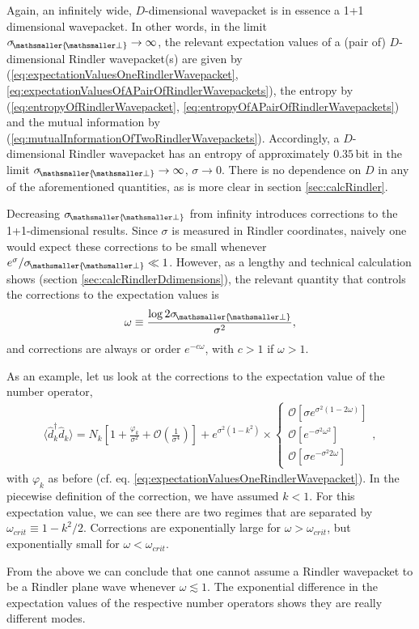 \documentclass[11pt, a4paper]{article}
\newcommand{\om}{\omega}
\newcommand{\si}{{\sigma}}
\let\perptmp\perp
\renewcommand{\perp}{{\! \mathsmaller{\perptmp}}}
\newcommand{\nodagger}{{\phantom{\dagger}}}
\newcommand{\ddd}{\langle \hat d_k^\dagger \hat d^\nodagger_k \rangle}
\begin{document}
Again, an infinitely wide, $D$-dimensional wavepacket is in essence a 1+1 dimensional wavepacket. In other words, in the limit $\si_\perp\to\infty$, the relevant expectation values of a (pair of) $D$-dimensional Rindler wavepacket(s) are given by (\ref{eq:expectationValuesOneRindlerWavepacket}, \ref{eq:expectationValuesOfAPairOfRindlerWavepackets}), the entropy by (\ref{eq:entropyOfRindlerWavepacket}, \ref{eq:entropyOfAPairOfRindlerWavepackets}) and the mutual information by (\ref{eq:mutualInformationOfTwoRindlerWavepackets}). Accordingly, a $D$-dimensional Rindler wavepacket has an entropy of approximately $0.35\,$bit in the limit $\si_\perp\to\infty$, $\si\to 0$. There is no dependence on $D$ in any of the aforementioned quantities, as is more clear in section \ref{sec:calcRindler}.

Decreasing $\si_\perp$ from infinity introduces corrections to the 1+1-dimensional results. Since $\si$ is measured in Rindler coordinates, naively one would expect these corrections to be small whenever $e^\si/\si_\perp\ll 1$. However, as a lengthy and technical calculation shows (section \ref{sec:calcRindlerDdimensions}), the relevant quantity that controls the corrections to the expectation values is 
\begin{equation*}
\om\equiv\frac{\log 2\si_\perp}{\si^2},
\end{equation*}
and corrections are always or order $e^{-c\om}$, with $c>1$ if $\om>1$.

As an example, let us look at the corrections to the expectation value of the number operator,
\begin{align*}
\ddd=N_k\left[1+\frac{\varphi_k}{\si^2}+\mathcal O\left(\frac{1}{\si^4}\right)\right]+
e^{\si^2(1-k^2)}\times
\left\{\begin{array}{ll}
\mathcal O [\si e^{\si^2(1-2\om)}]\\
\mathcal O [ e^{-\si^2\om^2}]\\
\mathcal O [\si e^{-\si^2 2\om}]
\end{array}\right. ,
\end{align*}
with $\varphi_k$ as before (cf. eq. \ref{eq:expectationValuesOneRindlerWavepacket}). In the piecewise definition of the correction, we have assumed $k<1$. For this expectation value, we can see there are two regimes that are separated by $\om_{crit}\equiv 1-k^2/2$. Corrections are exponentially large for $\om>\om_{crit}$, but exponentially small for $\om<\om_{crit}$. 

From the above we can conclude that one cannot assume a Rindler wavepacket to be a Rindler plane wave whenever $\om\lesssim 1$. The exponential difference in the expectation values of the respective number operators shows they are really different modes. 
\end{document}
